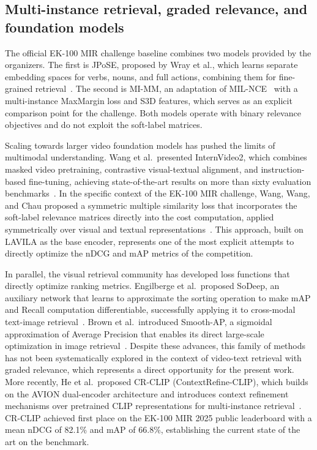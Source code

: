 \subsection*{Multi-instance retrieval, graded relevance, and foundation models}

The official EK-100 MIR challenge baseline combines two models provided by the organizers. The first is JPoSE, proposed by Wray et al., which learns separate embedding spaces for verbs, nouns, and full actions, combining them for fine-grained retrieval~\cite{wray2019jpose}. The second is MI-MM, an adaptation of MIL-NCE~\cite{miech2020milnce} with a multi-instance MaxMargin loss and S3D features, which serves as an explicit comparison point for the challenge. Both models operate with binary relevance objectives and do not exploit the soft-label matrices.

Scaling towards larger video foundation models has pushed the limits of multimodal understanding. Wang et al.~presented InternVideo2, which combines masked video pretraining, contrastive visual-textual alignment, and instruction-based fine-tuning, achieving state-of-the-art results on more than sixty evaluation benchmarks~\cite{wang2024internvideo2}. In the specific context of the EK-100 MIR challenge, Wang, Wang, and Chau proposed a symmetric multiple similarity loss that incorporates the soft-label relevance matrices directly into the cost computation, applied symmetrically over visual and textual representations~\cite{wang2024symmetricmultisimilaritylossepickitchens100}. This approach, built on LAVILA as the base encoder, represents one of the most explicit attempts to directly optimize the nDCG and mAP metrics of the competition.

In parallel, the visual retrieval community has developed loss functions that directly optimize ranking metrics. Engilberge et al.~proposed SoDeep, an auxiliary network that learns to approximate the sorting operation to make mAP and Recall computation differentiable, successfully applying it to cross-modal text-image retrieval~\cite{engilberge2019sodeep}. Brown et al.~introduced Smooth-AP, a sigmoidal approximation of Average Precision that enables its direct large-scale optimization in image retrieval~\cite{brown2020smoothap}. Despite these advances, this family of methods has not been systematically explored in the context of video-text retrieval with graded relevance, which represents a direct opportunity for the present work. More recently, He et al.~proposed CR-CLIP (ContextRefine-CLIP), which builds on the AVION dual-encoder architecture and introduces context refinement mechanisms over pretrained CLIP representations for multi-instance retrieval~\cite{he2025crclip}. CR-CLIP achieved first place on the EK-100 MIR 2025 public leaderboard with a mean nDCG of 82.1\% and mAP of 66.8\%, establishing the current state of the art on the benchmark.

